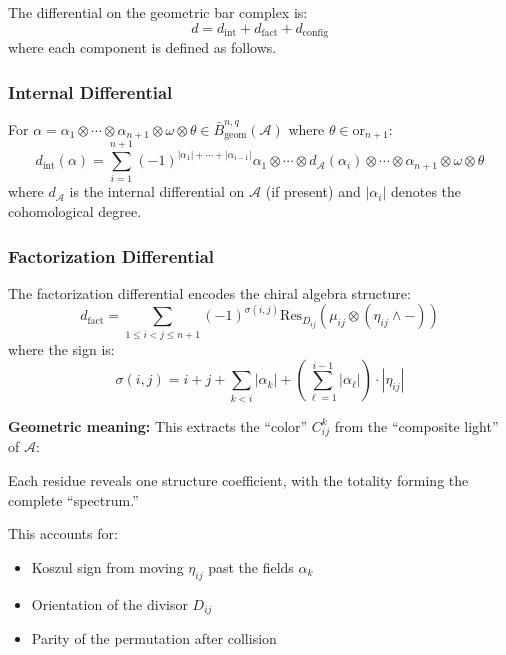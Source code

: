 \begin{definition}\label{def:diff-total}
The differential on the geometric bar complex is:
\[
d = d_{\text{int}} + d_{\text{fact}} + d_{\text{config}}
\]
where each component is defined as follows.
\end{definition}
 
\subsubsection{Internal Differential}
 
\begin{definition}
For $\alpha = \alpha_1 \otimes \cdots \otimes \alpha_{n+1} \otimes \omega \otimes \theta \in 
\bar{B}^{n,q}_{\text{geom}}(\mathcal{A})$ where $\theta \in \text{or}_{n+1}$:
\[
d_{\text{int}}(\alpha) = \sum_{i=1}^{n+1} (-1)^{|\alpha_1| + \cdots + |\alpha_{i-1}|} 
\alpha_1 \otimes \cdots \otimes d_{\mathcal{A}}(\alpha_i) \otimes \cdots \otimes \alpha_{n+1} \otimes \omega \otimes \theta
\]
where $d_{\mathcal{A}}$ is the internal differential on $\mathcal{A}$ (if present) and $|\alpha_i|$ denotes 
the cohomological degree.
\end{definition}
 
\subsubsection{Factorization Differential}
 
\begin{definition}\label{def:diff-fact}
   The factorization differential encodes the chiral algebra structure:
   \[
   d_{\text{fact}} = \sum_{1 \leq i < j \leq n+1} (-1)^{\sigma(i,j)} \text{Res}_{D_{ij}} \left(\mu_{ij} \otimes (\eta_{ij} \wedge -)\right)
   \]
   where the sign is:
   $$\sigma(i,j) = i + j + \sum_{k<i} |\alpha_k| + \left(\sum_{\ell=1}^{i-1} |\alpha_\ell|\right) \cdot |\eta_{ij}|$$
   
   \textbf{Geometric meaning:} This extracts the ``color'' $C_{ij}^k$ from the ``composite light'' of $\mathcal{A}$:
   \begin{center}
   \end{center}
   
   Each residue reveals one structure coefficient, with the totality forming the complete ``spectrum.''
   
   This accounts for:
   \begin{itemize}
   \item Koszul sign from moving $\eta_{ij}$ past the fields $\alpha_k$
   \item Orientation of the divisor $D_{ij}$  
   \item Parity of the permutation after collision
   \end{itemize}
   \end{definition}
   
